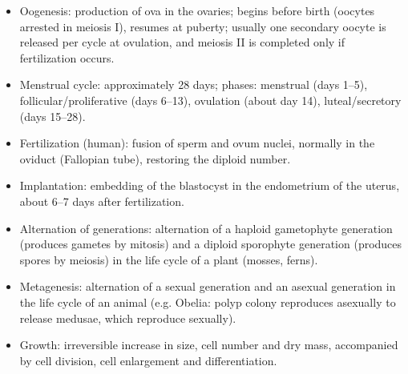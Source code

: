 \documentclass[11pt]{article}
\newcommand{\cle}[1]{{\popxbold\color{popdark}#1}}
\begin{document}
\begin{bilan}
\begin{itemize}
\item \cle{Oogenesis}: production of ova in the ovaries; begins before birth (oocytes arrested in meiosis I), resumes at puberty; usually one secondary oocyte is released per cycle at \cle{ovulation}, and meiosis II is completed only if fertilization occurs.
\item \cle{Menstrual cycle}: approximately 28 days; phases: menstrual (days 1--5), follicular/proliferative (days 6--13), ovulation (about day 14), luteal/secretory (days 15--28).
\item \cle{Fertilization} (human): fusion of sperm and ovum nuclei, normally in the oviduct (Fallopian tube), restoring the diploid number.
\item \cle{Implantation}: embedding of the blastocyst in the endometrium of the uterus, about 6--7 days after fertilization.
\item \cle{Alternation of generations}: alternation of a haploid \cle{gametophyte} generation (produces gametes by mitosis) and a diploid \cle{sporophyte} generation (produces spores by meiosis) in the life cycle of a plant (mosses, ferns).
\item \cle{Metagenesis}: alternation of a sexual generation and an asexual generation in the life cycle of an animal (e.g. Obelia: polyp colony reproduces asexually to release medusae, which reproduce sexually).
\item \cle{Growth}: irreversible increase in size, cell number and dry mass, accompanied by cell division, cell enlargement and differentiation.
\end{itemize}


\end{bilan}
\end{document}
